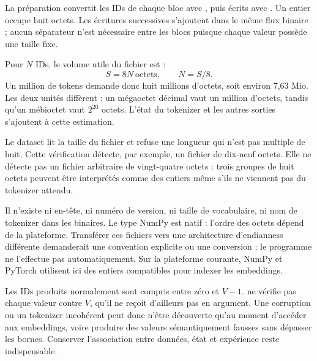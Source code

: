 La préparation convertit les IDs de chaque bloc avec
, puis écrits avec .
Un entier  occupe huit octets. Les écritures successives
s'ajoutent dans le même flux binaire ; aucun séparateur n'est nécessaire
entre les blocs puisque chaque valeur possède une taille fixe.

Pour \(N\) IDs, le volume utile du fichier est :
\[
    S=8N\ \text{octets},\qquad N=S/8.
\]
Un million de tokens demande donc huit millions d'octets, soit environ
7,63 Mio. Les deux unités diffèrent : un mégaoctet décimal vaut un million
d'octets, tandis qu'un mébioctet vaut \(2^{20}\) octets.
L'état du tokenizer et les autres sorties s'ajoutent à cette estimation.

Le dataset lit la taille du fichier et refuse une longueur qui n'est pas
multiple de huit. Cette vérification détecte, par exemple, un fichier
de dix-neuf octets. Elle ne détecte pas un fichier arbitraire de vingt-quatre
octets : trois groupes de huit octets peuvent être interprétés comme des
entiers même s'ils ne viennent pas du tokenizer attendu.

Il n'existe ni en-tête, ni numéro de version, ni taille de vocabulaire,
ni nom de tokenizer dans les binaires. Le type NumPy est natif :
l'ordre des octets dépend de la plateforme. Transférer ces fichiers vers
une architecture d'endianness différente demanderait une convention explicite
ou une conversion ; le programme ne l'effectue pas automatiquement.
Sur la plateforme courante, NumPy et PyTorch utilisent ici des entiers
compatibles pour indexer les embeddings.

Les IDs produits normalement sont compris entre zéro et \(V-1\).
 ne vérifie pas chaque valeur contre \(V\),
qu'il ne reçoit d'ailleurs pas en argument. Une corruption ou un tokenizer
incohérent peut donc n'être découverte qu'au moment d'accéder aux embeddings,
voire produire des valeurs sémantiquement fausses sans dépasser les bornes.
Conserver l'association entre données, état et expérience reste indispensable.



